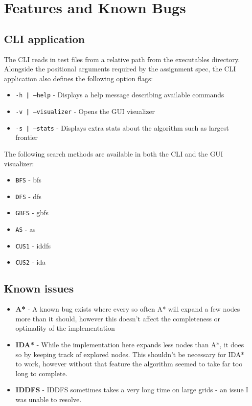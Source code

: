 \section{Features and Known Bugs} %
\label{sec:features}

\subsection{CLI application} %
\label{sub:cli_application}
The CLI reads in test files from a relative path from the executables directory. Alongside the positional arguments required by the assignment spec, the CLI application also defines the following option flags:
\begin{itemize}
	\item \texttt{-h | --help} - Displays a help message describing available commands
	\item \texttt{-v | --visualizer} - Opens the GUI visualizer
	\item \texttt{-s | --stats} - Displays extra stats about the algorithm such as largest frontier
\end{itemize}

The following search methods are available in both the CLI and the GUI visualizer:

\begin{itemize}
	\item \texttt{BFS} - \acrfull{bfs}
	\item \texttt{DFS} - \acrfull{dfs}
	\item \texttt{GBFS} - \acrfull{gbfs}
	\item \texttt{AS} - \acrfull{as}
	\item \texttt{CUS1} - \acrfull{iddfs}
	\item \texttt{CUS2} - \acrfull{ida}
\end{itemize}

\subsection{Known issues} %
\label{sub:known_bugs}

\begin{itemize}
	\item \textbf{A*} - A known bug exists where every so often A* will expand a few nodes more than it should, however this doesn't affect the completeness or optimality of the implementation
	\item \textbf{IDA*} - While the implementation here expands less nodes than A*, it does so by keeping track of explored nodes. This shouldn't be necessary for IDA* to work, however without that feature the algorithm seemed to take far too long to complete.
	\item \textbf{IDDFS} - IDDFS sometimes takes a very long time on large grids - an issue I was unable to resolve.
\end{itemize}


